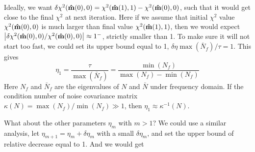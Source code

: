\documentclass[twocolumn,linenumbers]{aastex631}
\newcommand{\vbd}{\vb{d}}
\newcommand{\inv}[1]{#1^{-1}}
\newcommand{\hatm}{\vb{\hat{m}}}
\newcommand{\Nbar}{\bar{N}}
\begin{document}
Ideally, we want
$\delta \chi^2(\hatm(0),0) = \chi^2(\hatm(1), 1) - \chi^2(\hatm(0),0)$,
such that it would get close to the final $\chi^2$ at next iteration.
Here if we assume that initial $\chi^2$ value $\chi^2(\hatm(0),0)$ is much
larger than final value $\chi^2(\hatm(1),1)$,
then we would expect
$\qty|\delta\chi^2(\hatm(0),0)/\chi^2(\hatm(0),0)| \approx 1^-$,
strictly smaller than 1.
To make sure it will not start too fast, 
we could set its upper bound equal to 1, $\delta \eta \max(\Nbar_f) / \tau = 1$.
This gives
\begin{equation}
\eta_1 = \frac{\tau}{\max(\Nbar_f)} = \frac{\min(N_f)}{\max(N_f) - \min(N_f)}
\end{equation}
Here $N_f$ and $\Nbar_f$ are the eigenvalues of $N$ and $\Nbar$ under frequency
domain.
If the condition number of noise covariance matrix
$\kappa(N) = \max(N_f)/\min(N_f) \gg 1$,
then $\eta_1 \approx \inv{\kappa} (N)$.

What about the other parameters $\eta_m$ with $m > 1$?
We could use a similar analysis,
let $\eta_{m+1} = \eta_m + \delta \eta_m$ with a small $\delta\eta_m$,
and set the upper bound of relative decrease equal to 1.
And we would get
\end{document}
